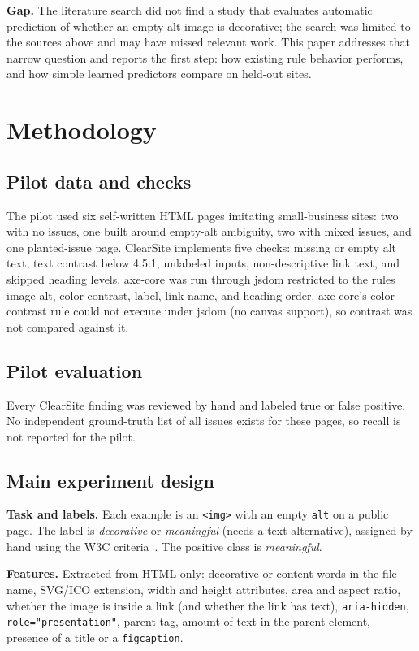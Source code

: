 \documentclass[sigconf,anonymous]{acmart}
\begin{document}
\textbf{Gap.} The literature search did not find a study that evaluates automatic prediction of whether an empty-alt image is decorative; the search was limited to the sources above and may have missed relevant work. This paper addresses that narrow question and reports the first step: how existing rule behavior performs, and how simple learned predictors compare on held-out sites.

\section{Methodology}
\subsection{Pilot data and checks}
The pilot used six self-written HTML pages imitating small-business sites: two with no issues, one built around empty-alt ambiguity, two with mixed issues, and one planted-issue page. ClearSite implements five checks: missing or empty alt text, text contrast below 4.5:1, unlabeled inputs, non-descriptive link text, and skipped heading levels. axe-core was run through jsdom restricted to the rules image-alt, color-contrast, label, link-name, and heading-order. axe-core's color-contrast rule could not execute under jsdom (no canvas support), so contrast was not compared against it.

\subsection{Pilot evaluation}
Every ClearSite finding was reviewed by hand and labeled true or false positive. No independent ground-truth list of all issues exists for these pages, so recall is not reported for the pilot.

\subsection{Main experiment design}
\textbf{Task and labels.} Each example is an \texttt{<img>} with an empty \texttt{alt} on a public page. The label is \emph{decorative} or \emph{meaningful} (needs a text alternative), assigned by hand using the W3C criteria~\cite{w3cdecorative}. The positive class is \emph{meaningful}.

\textbf{Features.} Extracted from HTML only: decorative or content words in the file name, SVG/ICO extension, width and height attributes, area and aspect ratio, whether the image is inside a link (and whether the link has text), \texttt{aria-hidden}, \texttt{role="presentation"}, parent tag, amount of text in the parent element, presence of a title or a \texttt{figcaption}.
\end{document}
